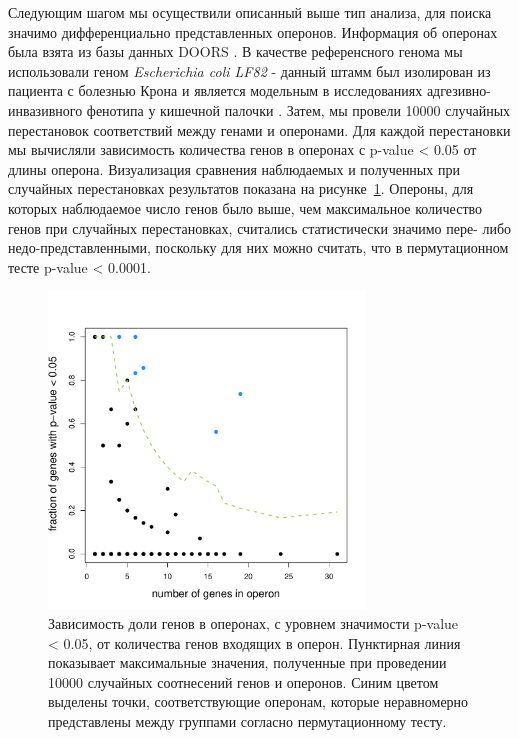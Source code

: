 Следующим шагом мы осуществили описанный выше тип анализа, для поиска значимо дифференциально представленных оперонов. Информация об оперонах была взята из базы данных DOORS \cite{mao2014door}. В качестве референсного генома мы использовали геном \textit{Escherichia coli LF82} - данный штамм был изолирован из пациента с болезнью Крона и является модельным в исследованиях адгезивно-инвазивного фенотипа у кишечной палочки \cite{miquel2010complete}. Затем, мы провели 10000 случайных перестановок соответствий между генами и оперонами. Для каждой перестановки мы вычисляли зависимость количества генов в оперонах с p-value < 0.05 от длины оперона. Визуализация сравнения наблюдаемых и полученных при случайных перестановках результатов показана на рисунке~\ref{img:operons_shuffle}. Опероны, для которых наблюдаемое число генов было выше, чем максимальное количество генов при случайных перестановках, считались статистически значимо пере- либо недо-представленными, поскольку для них можно считать, что в пермутационном тесте p-value < 0.0001. 

\begin{figure}[!ht] 
  \center
    \includegraphics [width=0.75\textwidth] {Dissertation/images/operons/statsignificant_operons.pdf}
    \caption{Зависимость доли генов в оперонах, с уровнем значимости p-value < 0.05, от количества генов входящих в оперон. Пунктирная линия показывает максимальные значения, полученные при проведении 10000 случайных соотнесений генов и оперонов. Синим цветом выделены точки, соответствующие оперонам, которые неравномерно представлены между группами согласно пермутационному тесту.}
    \label{img:operons_shuffle}
\end{figure}

